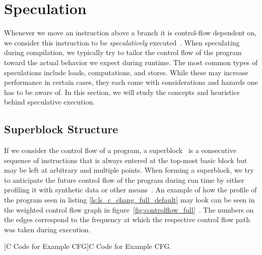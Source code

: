 \section{Speculation}
\label{sec:speculation}
Whenever we move an instruction above a branch it is control-flow dependent on, we consider this instruction to be \textit{speculatively} executed~\cite{chang95}. When speculating during compilation, we typically try to tailor the control flow of the program toward the actual behavior we expect during runtime. The most common types of speculations include loads, computations, and stores. While these may increase performance in certain cases, they each come with considerations and hazards one has to be aware of. In this section, we will study the concepts and heuristics behind speculative execution. 

\subsection{Superblock Structure}
\label{sec:superblock_struct}
If we consider the control flow of a program, a superblock~\cite{10.1145/161541.159765} is a consecutive sequence of instructions that is always entered at the top-most basic block but may be left at arbitrary and multiple points. When forming a superblock, we try to anticipate the future control flow of the program during run time by either profiling it with synthetic data or other means~\cite{639244}. An example of how the profile of the program seen in listing \ref{ls:ls_c_chang_full_default} may look can be seen in the weighted control flow graph in figure~\ref{fig:controlflow_full}~\cite{chang95}. The numbers on the edges correspond to the frequency at which the respective control flow path was taken during execution. 

\begin{center}
    \begin{minipage}{.45\textwidth}
            
        \captionsetup{type=listing}
        [C Code for Example CFG]{C Code for Example CFG.}
        \label{ls:ls_c_chang_full_default}
    \end{minipage}
\end{center}


